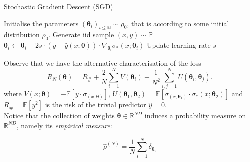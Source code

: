 \documentclass{article}
\theoremstyle{mystyle}
\newcommand{\N}{\ensuremath{\mathbb{N}}}
\newcommand{\R}{\ensuremath{\mathbb{R}}}
\newcommand{\PP}{\ensuremath{\mathbb{P}}}
\begin{document}
\newpage
\begin{codeblock}{Stochastic Gradient Descent (SGD)}\label{alg: SGD}
\begin{algorithmic}
\State Initialise the parameters $(\mathbf{\theta}_{i})_{i\leq \N} \sim \rho_{0}$, that is according to some initial distribution $ \rho_{0}$.
\State Generate iid sample $ (x, y)\sim \PP$
\State $\mathbf{\theta}_{i}\gets\mathbf{\theta}_{i}+2s\cdot (y-\hat{y}(x;\mathbf{\theta}))\cdot \nabla_{\mathbf{\theta}_{i}}\sigma_{*}(x;\mathbf{\theta}_i)$ 
\State Update learning rate $ s$
\EndFor
\EndWhile
\end{algorithmic}

\end{codeblock}

Observe that we have the alternative characterisation of the loss
\begin{equation}\label{eq: loss expanded}
	R_{N}(\mathbf{\theta}) = R_{\#}+ \frac{2}{N}\displaystyle\sum^{N}_{i=1}V(\mathbf{\theta}_{i})+\frac{1}{N^{2}}\displaystyle\sum^{N}_{i,j=1}U(\mathbf{\theta}_{i},\mathbf{\theta}_{j}).
\end{equation} 
where $ V(x; \mathbf{\theta}) = -\mathbb{E}[y\cdot \sigma_(x: \mathbf{\theta})]$, $ U( \mathbf{\theta}_{1}, \mathbf{\theta}_{2}) =\mathbb{E}[\sigma_(x; \mathbf{\theta}_{1})\cdot \sigma_*(x; \mathbf{\theta}_{2})]$ and $ R_{\#}=\mathbb{E}[y^{2}]$ is the risk of the trivial predictor $ \hat{y} = 0$.\\ 

Notice that the collection of weights $  \mathbf{\theta}\in \R^{ND}$ induces a probability measure on $ \R^{ND}$, namely its \textit{empirical measure}:

\begin{equation}\label{eq: empirical measure}
	\hat{\rho}^{(N)} = \frac{1}{N}\displaystyle\sum^{N}_{i=1}\delta_{ \mathbf{\theta}_{i}} 
\end{equation}
\end{document}
